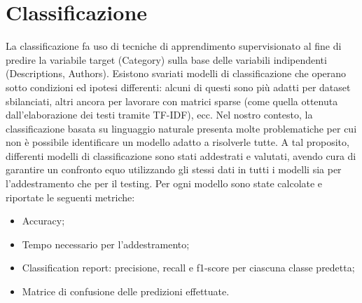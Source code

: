 \documentclass[12pt,oneside]{article}
\begin{document}
\section{Classificazione}
    \begin{justify}
        La classificazione fa uso di tecniche di apprendimento supervisionato al fine di predire la variabile target (Category) sulla base delle variabili indipendenti (Descriptions, Authors).
        Esistono svariati modelli di classificazione che operano sotto condizioni ed ipotesi differenti: alcuni di questi sono più adatti per dataset sbilanciati, altri ancora per lavorare con matrici sparse (come quella ottenuta dall’elaborazione dei testi tramite TF-IDF), ecc. Nel nostro contesto, la classificazione basata su linguaggio naturale presenta molte problematiche per cui non è possibile identificare un modello adatto a risolverle tutte. A tal proposito, differenti modelli di classificazione sono stati addestrati e valutati, avendo cura di garantire un confronto equo utilizzando gli stessi dati in tutti i modelli sia per l’addestramento che per il testing.
        Per ogni modello sono state calcolate e riportate le seguenti metriche:
        \begin{itemize}
            \item Accuracy;
            \item Tempo necessario per l’addestramento;
            \item Classification report: precisione, recall e f1-score per ciascuna classe predetta;
            \item Matrice di confusione delle predizioni effettuate.
        \end{itemize}
    \end{justify}
   
\end{document}
